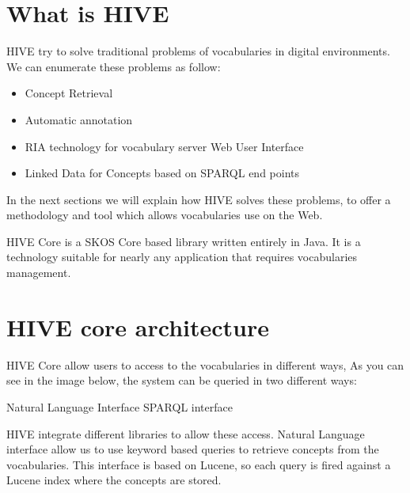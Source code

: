 \section{What is HIVE}

HIVE try to solve traditional problems of vocabularies in digital environments. We can enumerate these problems as follow:

\begin{itemize}
\item Concept Retrieval
\item Automatic annotation
\item RIA technology for vocabulary server Web User Interface
\item Linked Data for Concepts based on SPARQL end points
\end{itemize}

In the next sections we will explain how HIVE solves these problems, to offer a 
methodology and tool which allows vocabularies use on the Web.

HIVE Core is a SKOS Core based library written entirely in Java. It is a technology suitable for nearly any application that requires 
vocabularies management.

\section{HIVE core architecture}

HIVE Core allow users to access to the vocabularies in different ways, As you can see in the image below, the system can be queried in two different ways:

Natural Language Interface
SPARQL interface

HIVE integrate different libraries to allow these access. Natural Language interface allow us to use keyword based queries to retrieve concepts from the vocabularies. 
This interface is based on Lucene, so each query is fired against a Lucene index where the concepts are stored.

